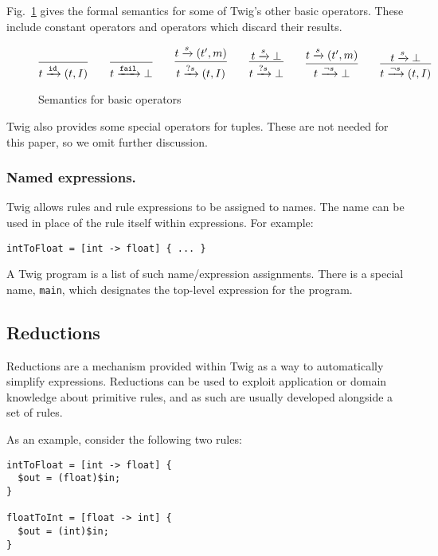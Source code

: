 Fig.~\ref{fig:twig-basic} gives the formal semantics for some of
Twig's other basic operators. These include constant operators and
operators which discard their results.

\begin{figure}[ht]
\[
\infer{t \arr{\mathtt{id}} (t,I)}{}
\qquad
\infer{t \arr{\mathtt{fail}} \bot}{}
\qquad
\infer{t \arr{?s} (t,I)}{t \arr{s} (t',m)}
\qquad 
\infer{t \arr{?s} \bot}{t \arr{s} \bot}
\qquad
\infer{t \arr{\lnot s} \bot}{t \arr{s} (t',m)}
\qquad 
\infer{t \arr{\lnot s} (t,I)}{t \arr{s} \bot}
\]
\caption{Semantics for basic operators}
\label{fig:twig-basic}
\end{figure}

Twig also provides some special operators for tuples. These are
not needed for this paper, so we omit further discussion.

\subsubsection{Named expressions.}
\label{sec:names}

Twig allows rules and rule expressions to be assigned to names.
The name can be used in place of the rule itself within
expressions. For example:

\begin{verbatim}
intToFloat = [int -> float] { ... }
\end{verbatim}

A Twig program is a list of such name/expression assignments.
There is a special name, \texttt{main}, which designates the
top-level expression for the program.

\subsection{Reductions}
\label{sec:reductions}

Reductions are a mechanism provided within Twig as a way to
automatically simplify expressions. Reductions can be used to
exploit application or domain knowledge about primitive rules, and
as such are usually developed alongside a set of rules.

As an example, consider the following two rules:

\begin{verbatim}
intToFloat = [int -> float] {
  $out = (float)$in;
}

floatToInt = [float -> int] {
  $out = (int)$in;
}
\end{verbatim}


